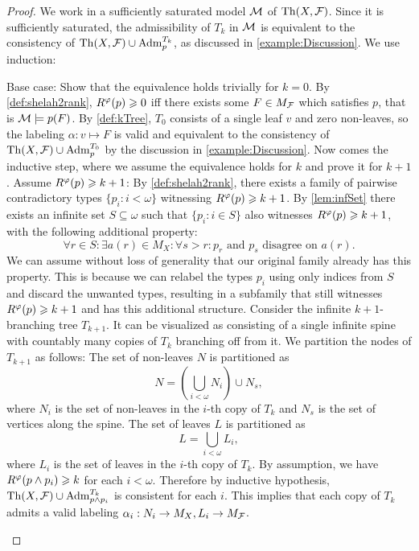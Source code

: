 \begin{proof}
We work in a sufficiently saturated model $\mathcal{M}$ of $\operatorname{Th}(X,\mathcal{F})$. Since it is sufficiently saturated, the admissibility of $T_k$ in $\mathcal{M}$ is equivalent to the consistency of $\operatorname{Th}(X,\mathcal{F})\cup \operatorname{Adm}^{T_k}_{p}$, as discussed in \cref{example:Discussion}. We use induction:
\begin{outline}
    \1 Base case: Show that the equivalence holds trivially for $k=0$.
        \2 By \cref{def:shelah2rank}, $R^\varphi(p) \geqslant 0$ iff there exists some $F\in M_{\mathcal{F}}$ which satisfies $p$, that is $\mathcal{M}\models p(F)$.
        \2 By \cref{def:kTree}, $T_0$ consists of a single leaf $v$ and zero non-leaves, so the labeling $\alpha: v \mapsto F$ is valid and equivalent to the consistency of $\operatorname{Th}(X,\mathcal{F})\cup \operatorname{Adm}^{T_0}_{p}$ by the discussion in \cref{example:Discussion}.
\0 Now comes the inductive step, where we assume the equivalence holds for $k$ and prove it for $k+1$.
    \1 Assume $R^\varphi(p)\geqslant k+1$:
        \2 By \cref{def:shelah2rank}, there exists a family of pairwise contradictory types $\{p_i : i<\omega\}$ witnessing $R^\varphi(p) \geqslant k+1$.
        \2 By \cref{lem:infSet} there exists an infinite set $S\subseteq\omega$ such that $\{p_i : i\in S\}$ also witnesses $R^\varphi(p) \geqslant k+1$, with the following additional property:
        $$\forall r \in S : \exists a(r) \in M_X : \forall s > r : p_r \text{ and } 
        p_s \text { disagree on } a(r).$$
        We can assume without loss of generality that our original family already has this property. This is because we can relabel the types $p_i$ using only indices from $S$ and discard the unwanted types, resulting in a subfamily that still witnesses $R^\varphi(p)\geqslant k+1$ and has this additional structure.
        \2 Consider the infinite $k+1$-branching tree $T_{k+1}$. It can be visualized as consisting of a single infinite spine with countably many copies of $T_k$ branching off from it. We partition the nodes of $T_{k+1}$ as follows:
            \3 The set of non-leaves $N$ is partitioned as 
            $$N=\left(\bigcup_{i<\omega} N_i \right) \cup N_s,$$
            where $N_i$ is the set of non-leaves in the $i$-th copy of $T_k$ and $N_s$ is the set of vertices along the spine. 
            \3 The set of leaves $L$ is partitioned as 
            $$L=\bigcup_{i<\omega} L_i,$$
            where $L_i$ is the set of leaves in the $i$-th copy of $T_k$.
        \2 By assumption, we have $R^\varphi(p \land p_{i})\geqslant k$ for each $i<\omega$. Therefore by inductive hypothesis, $\operatorname{Th}(X,\mathcal{F})\cup\operatorname{Adm}^{T_k}_{p\land p_i}$ is consistent for each $i$. This implies that each copy of $T_k$ admits a valid labeling $\alpha_i: N_i \rightarrow M_X, L_i \rightarrow M_{\mathcal{F}}$. 

\end{outline}
\end{proof}
